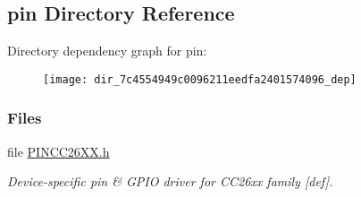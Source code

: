 \subsection{pin Directory Reference}
\label{dir_7c4554949c0096211eedfa2401574096}
Directory dependency graph for pin\+:
\nopagebreak
\begin{figure}[H]
\begin{center}
\leavevmode
\texttt{[image: dir\_7c4554949c0096211eedfa2401574096\_dep]}
\end{center}
\end{figure}
\subsubsection*{Files}
\begin{DoxyCompactItemize}
\item 
file \hyperlink{_p_i_n_c_c26_x_x_8h}{P\+I\+N\+C\+C26\+X\+X.\+h}
\begin{DoxyCompactList}\small\item\em Device-\/specific pin \& G\+P\+I\+O driver for C\+C26xx family \mbox{[}def\mbox{]}. \end{DoxyCompactList}\end{DoxyCompactItemize}
